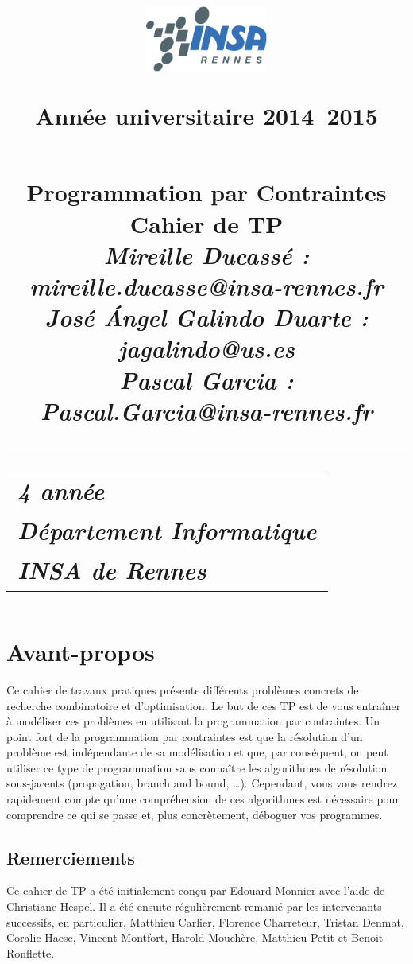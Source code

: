 \documentclass[12pt]{report}
\title{
\begin{flushleft}
{\includegraphics[width=4cm]{insa.pdf}}
\vspace{-2cm}
\end{flushleft}
\begin{flushright}
\normalsize
Année universitaire 2014--2015
\end{flushright}
\vspace{10ex}
\rule{12cm}{1mm}
\huge{Programmation par Contraintes}\\
\vspace{5ex}
\Large{Cahier de TP}\\
\vspace{5ex}
\large{\it Mireille Ducassé : mireille.ducasse@insa-rennes.fr\\
José Ángel Galindo Duarte : jagalindo@us.es\\
Pascal Garcia : Pascal.Garcia@insa-rennes.fr
}\\
\rule{12cm}{1mm}
\vspace{15ex}
\begin{flushleft}
\begin{tabular}{l}
\textit{4\up{ème} année}\\
\textit{Département Informatique}\\
\textit{INSA de Rennes}
\end{tabular}
\end{flushleft}
}
\author{}
\date{}
\begin{document}
\pagestyle{empty}
\maketitle
\pagestyle{plain}
\renewcommand{\chaptername}{TP} %
\renewcommand{\thechapter}{\arabic{chapter}}
\renewcommand{\thesection}{\arabic{section}}
\renewcommand{\thesubsection}{\thesection.\arabic{subsection}}

{
\setlength{\baselineskip}{1.8\baselineskip} %
\renewcommand{\contentsname}{\centerline{Sommaire}} %
\tableofcontents
}

\cleardoublepage
\chapter*{Avant-propos}

Ce cahier de travaux pratiques présente différents problèmes concrets
de recherche combinatoire et d'optimisation. Le but de ces TP est de
vous entraîner à modéliser ces problèmes en utilisant la programmation
par contraintes. Un point fort de la programmation par contraintes est
que la résolution d'un problème est indépendante de sa modélisation et
que, par conséquent, on peut utiliser ce type de programmation sans
connaître les algorithmes de résolution sous-jacents (propagation,
branch and bound, \ldots). Cependant, vous vous rendrez rapidement
compte qu'une compréhension de ces algorithmes est nécessaire pour
comprendre ce qui se passe et, plus concrètement, déboguer vos
programmes.



\section*{Remerciements}

Ce cahier de TP a été initialement conçu par Edouard Monnier avec
l'aide de Christiane Hespel. Il a été ensuite régulièrement remanié
par les intervenants successifs, en particulier, Matthieu Carlier,
Florence Charreteur, Tristan Denmat, Coralie Haese, Vincent Montfort,
Harold Mouchère, Matthieu Petit et Benoit Ronflette.




\end{document}
